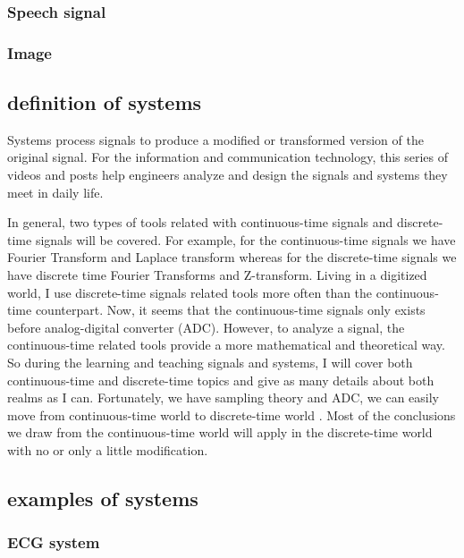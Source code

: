 \documentclass[koma,utopia,letterpaper,captions=tableheading,11pt,listings-sv,microtype,paralist,colorlinks=true,urlcolor=blue]{org-article}
\begin{document}
\subsubsection{Speech signal}
\label{sec:org4599249}

\subsubsection{Image}
\label{sec:orgb9ba77a}



\subsection{definition of systems}
\label{sec:org50a98a3}


Systems process signals to produce a modified or transformed version of the
original signal. For the information and communication technology, this series
of videos and posts help engineers analyze and design the signals and systems
they meet in daily life.

In general, two types of tools related with continuous-time signals and
discrete-time signals will be covered. For example, for the continuous-time
signals we have Fourier Transform and Laplace transform whereas for the
discrete-time signals we have discrete time Fourier Transforms and Z-transform.
Living in a digitized world, I use discrete-time signals related tools more
often than the continuous-time counterpart. Now, it seems that the
continuous-time signals only exists before analog-digital converter (ADC).
However, to analyze a signal, the continuous-time related tools provide a more
mathematical and theoretical way. So during the learning and teaching signals
and systems, I will cover both continuous-time and discrete-time topics and give
as many details about both realms as I can. Fortunately, we have sampling theory
and ADC, we can easily move from continuous-time world to discrete-time world .
Most of the conclusions we draw from the continuous-time world will apply in the
discrete-time world with no or only a little modification.
\subsection{examples of systems}
\label{sec:org371aacc}


\subsubsection{ECG system}
\label{sec:orge20180e}
\end{document}
